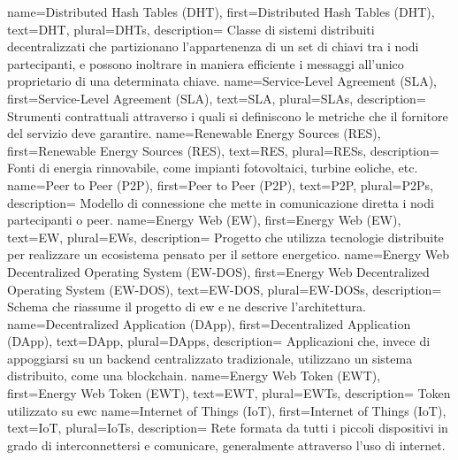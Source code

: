 {
    name={Distributed Hash Tables (DHT)},
    first={Distributed Hash Tables (DHT)},
    text={DHT},
    plural={DHTs},
    description={ 
        Classe di sistemi distribuiti decentralizzati che partizionano l'appartenenza di un set di chiavi tra i nodi partecipanti, 
        e possono inoltrare in maniera efficiente i messaggi all'unico proprietario di una determinata chiave. 
    }
}
{
    name={Service-Level Agreement (SLA)},
    first={Service-Level Agreement (SLA)},
    text={SLA},
    plural={SLAs},
    description={ 
        Strumenti contrattuali attraverso i quali si definiscono le metriche che il fornitore del servizio deve garantire. 
    }
}
{
    name={Renewable Energy Sources (RES)},
    first={Renewable Energy Sources (RES)},
    text={RES},
    plural={RESs},
    description={ 
        Fonti di energia rinnovabile, come impianti fotovoltaici, turbine eoliche, etc. 
    }
}
{
    name={Peer to Peer (P2P)},
    first={Peer to Peer (P2P)},
    text={P2P},
    plural={P2Ps},
    description={ 
        Modello di connessione che mette in comunicazione diretta i nodi partecipanti o peer. 
    }
}
{
    name={Energy Web (EW)},
    first={Energy Web (EW)},
    text={EW},
    plural={EWs},
    description={ 
        Progetto che utilizza tecnologie distribuite per realizzare un ecosistema pensato per il settore energetico. 
    }
}
{
    name={Energy Web Decentralized Operating System (EW-DOS)},
    first={Energy Web Decentralized Operating System (EW-DOS)},
    text={EW-DOS},
    plural={EW-DOSs},
    description={ 
        Schema che riassume il progetto di \gls{ew} e ne descrive l'architettura.
    }
}
{
    name={Decentralized Application (DApp)},
    first={Decentralized Application (DApp)},
    text={DApp},
    plural={DApps},
    description={ 
        Applicazioni che, invece di appoggiarsi su un backend centralizzato tradizionale, 
        utilizzano un sistema distribuito, come una blockchain. 
    }
}
{
    name={Energy Web Token (EWT)},
    first={Energy Web Token (EWT)},
    text={EWT},
    plural={EWTs},
    description={ 
        Token utilizzato su \gls{ewc} 
    }
}
{
    name={Internet of Things (IoT)},
    first={Internet of Things (IoT)},
    text={IoT},
    plural={IoTs},
    description={ 
        Rete formata da tutti i piccoli dispositivi in grado di interconnettersi e comunicare, 
        generalmente attraverso l'uso di internet. 
    }
}
